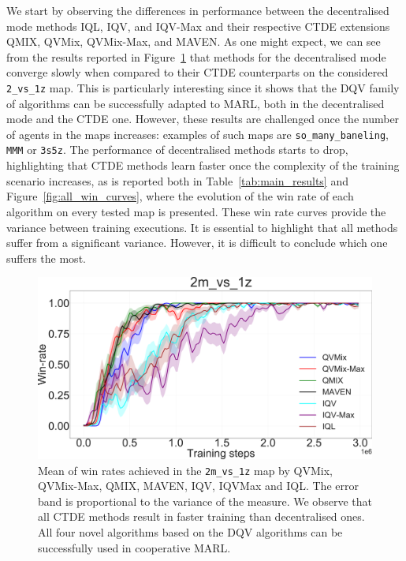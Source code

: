 We start by observing the differences in performance between the decentralised mode methods IQL, IQV, and IQV-Max and their respective CTDE extensions QMIX, QVMix, QVMix-Max, and MAVEN.
As one might expect, we can see from the results reported in Figure~\ref{fig:ch4_2m1zwin} that methods for the decentralised mode converge slowly when compared to their CTDE counterparts on the considered \texttt{2\_vs\_1z} map.
This is particularly interesting since it shows that the DQV family of algorithms can be successfully adapted to MARL, both in the decentralised mode and the CTDE one.
However, these results are challenged once the number of agents in the maps increases: examples of such maps are \texttt{so\_many\_baneling}, \texttt{MMM} or \texttt{3s5z}.
The performance of decentralised methods starts to drop, highlighting that CTDE methods learn faster once the complexity of the training scenario increases, as is reported both in Table~\ref{tab:main_results} and Figure~\ref{fig:all_win_curves}, where the evolution of the win rate of each algorithm on every tested map is presented.
These win rate curves provide the variance between training executions.
It is essential to highlight that all methods suffer from a significant variance.
However, it is difficult to conclude which one suffers the most.

\begin{figure}
\centering
\includegraphics[width=.8\linewidth]{tex_thesis/figures/ch4/2m1zall.pdf}
\caption{Mean of win rates achieved in the \texttt{2m\_vs\_1z} map by QVMix, QVMix-Max, QMIX, MAVEN, IQV, IQVMax and IQL. The error band is proportional to the variance of the measure. We observe that all CTDE methods result in faster training than decentralised ones. All four novel algorithms based on the DQV algorithms can be successfully used in cooperative MARL.}
\label{fig:ch4_2m1zwin}
\end{figure}

